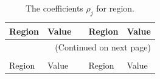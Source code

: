 \documentclass[letterpaper,12pt,article]{memoir}
\begin{document}
\begin{center}
\begin{longtable}{lllll}
    \toprule
    Region & Value & \hspace{1em} & Region & Value \\
    \midrule
    \endfirsthead
    
    \midrule
    \multicolumn{5}{r}{(Continued on next page)} \\
    \bottomrule
    \endfoot
    
    \bottomrule
    \\[-4pt]
    \caption{The coefficients $\rho_j$ for region.}
    \label{tab:regions}
    \endlastfoot
    
    \toprule
    Region & Value & \hspace{1.5em} & Region & Value \\
    \midrule
    \endhead
    

\end{longtable}
\end{center}
\end{document}
